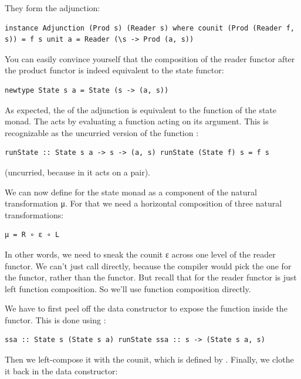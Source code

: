 They form the adjunction:

\begin{verbatim}
instance Adjunction (Prod s) (Reader s) where counit (Prod (Reader f, s)) = f s unit a = Reader (\s -> Prod (a, s))
\end{verbatim}

You can easily convince yourself that the composition of the reader
functor after the product functor is indeed equivalent to the state
functor:

\begin{verbatim}
newtype State s a = State (s -> (a, s))
\end{verbatim}

As expected, the  of the adjunction is equivalent to the
 function of the state monad. The  acts by
evaluating a function acting on its argument. This is recognizable as
the uncurried version of the function :

\begin{verbatim}
runState :: State s a -> s -> (a, s) runState (State f) s = f s
\end{verbatim}

(uncurried, because in  it acts on a pair).

We can now define  for the state monad as a component of
the natural transformation μ. For that we need a horizontal composition
of three natural transformations:

\begin{verbatim}
μ = R ∘ ε ∘ L
\end{verbatim}

In other words, we need to sneak the counit ε across one level of the
reader functor. We can't just call  directly, because the
compiler would pick the one for the  functor, rather than
the  functor. But recall that  for the
reader functor is just left function composition. So we'll use function
composition directly.

We have to first peel off the data constructor  to expose
the function inside the  functor. This is done using
:

\begin{verbatim}
ssa :: State s (State s a) runState ssa :: s -> (State s a, s)
\end{verbatim}

Then we left-compose it with the counit, which is defined by
. Finally, we clothe it back in the
 data constructor:


